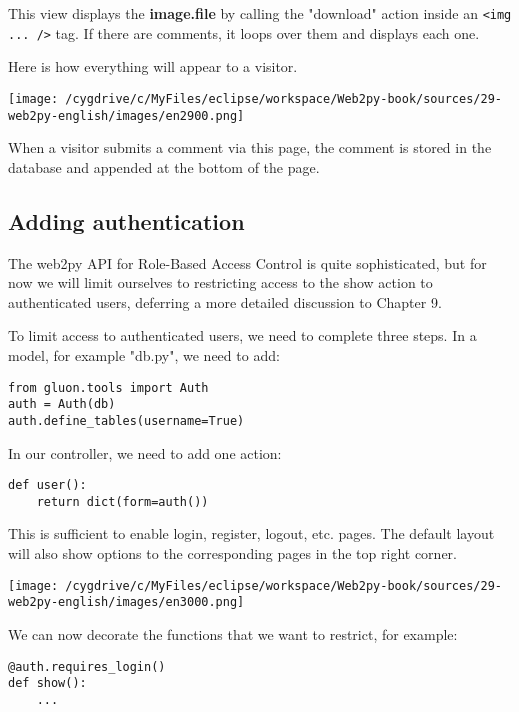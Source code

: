 \documentclass[justified,sixbynine,notoc]{tufte-book}
\def\ft{\small\tt}
\begin{document}
\begin{fullwidth}
This view displays the {\bf image.file} by calling the "download" action inside an {\ft <img ... />} tag.
If there are comments, it loops over them and displays each one.

Here is how everything will appear to a visitor.


\goodbreak\begin{center}\texttt{[image: /cygdrive/c/MyFiles/eclipse/workspace/Web2py-book/sources/29-web2py-english/images/en2900.png]}\end{center}


When a visitor submits a comment via this page, the comment is stored in the database and appended at the bottom of the page.

\goodbreak\subsection{Adding authentication}

The web2py API for Role-Based Access Control is quite sophisticated, but for now we will limit ourselves to restricting access to the show action to authenticated users, deferring a more detailed discussion to Chapter 9.

To limit access to authenticated users, we need to complete three steps. In a model, for example "db.py", we need to add:
\begin{lstlisting}
from gluon.tools import Auth
auth = Auth(db)
auth.define_tables(username=True)
\end{lstlisting}

In our controller, we need to add one action:
\begin{lstlisting}
def user():
    return dict(form=auth())
\end{lstlisting}

This is sufficient to enable login, register, logout, etc. pages. The default layout will also show options to the corresponding pages in the top right corner.


\goodbreak\begin{center}\texttt{[image: /cygdrive/c/MyFiles/eclipse/workspace/Web2py-book/sources/29-web2py-english/images/en3000.png]}\end{center}


We can now decorate the functions that we want to restrict, for example:
\begin{lstlisting}
@auth.requires_login()
def show():
    ...
\end{lstlisting}


\end{fullwidth}
\end{document}
